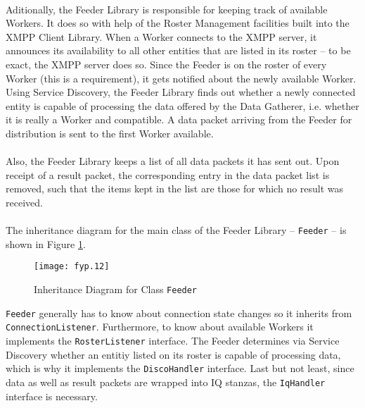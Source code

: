 \paragraph{}
Aditionally, the Feeder Library is responsible for keeping track of available Workers. It does so with help of the Roster Management facilities built into the XMPP Client Library. When a Worker connects to the XMPP server, it announces its availability to all other entities that are listed in its roster -- to be exact, the XMPP server does so. Since the Feeder is on the roster of every Worker (this is a requirement), it gets notified about the newly available Worker. Using Service Discovery, the Feeder Library finds out whether a newly connected entity is capable of processing the data offered by the Data Gatherer, i.e. whether it is really a Worker and compatible. A data packet arriving from the Feeder for distribution is sent to the first Worker available.

\paragraph{}
Also, the Feeder Library keeps a list of all data packets it has sent out. Upon receipt of a result packet, the corresponding entry in the data packet list is removed, such that the items kept in the list are those for which no result was received.

\paragraph{}
The inheritance diagram for the main class of the Feeder Library -- \texttt{Feeder} -- is shown in Figure \ref{fig:inhfeeder}.

\begin{figure}[H]
\begin{center}
\texttt{[image: fyp.12]}
\end{center}
\caption{Inheritance Diagram for Class \texttt{Feeder}}
\label{fig:inhfeeder}
\end{figure}

\texttt{Feeder} generally has to know about connection state changes so it inherits from \texttt{ConnectionListener}. Furthermore, to know about available Workers it implements the \texttt{RosterListener} interface. The Feeder determines via Service Discovery whether an entitiy listed on its roster is capable of processing data, which is why it implements the \texttt{DiscoHandler} interface. Last but not least, since data as well as result packets are wrapped into IQ stanzas, the \texttt{IqHandler} interface is necessary.


